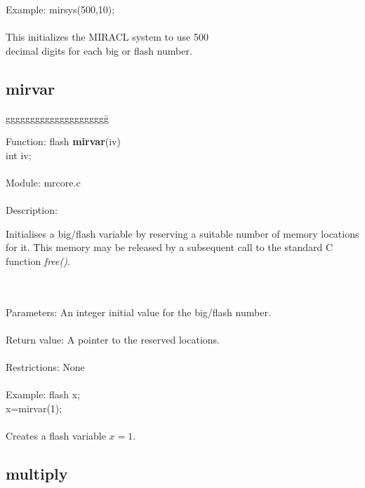 \begin{tabbing}
      Example:       \>mirsys(500,10); \\
      \ \\
                     \>This initializes the MIRACL system to use 500  \\
                     \>decimal digits for each big or flash number. \\

\end{tabbing}

\subsection{mirvar}

\begin{tabbing}
ggggggggggggggggggggg\= \kill

      Function:      \>flash {\bf mirvar}(iv) \\
                     \>int iv; \\
      \ \\
      Module:        \>mrcore.c \\
      \ \\
      Description:   \>
                     \parbox [t]{3 in}
                     {Initialises a big/flash variable by reserving a
                     suitable number of memory locations for it. This memory
                     may be released by a subsequent call to the standard C
                     function {\em free()}.} \\
      \ \\
      Parameters:    \>An integer initial value for the big/flash number. \\
      \ \\
      Return value:  \>A pointer to the reserved locations. \\
      \ \\
      Restrictions:  \>None \\
      \ \\
      Example:       \>flash x; \\
                     \>x=mirvar(1); \\
      \ \\
                     \>Creates a flash variable $x=1$. \\

\end{tabbing}

\subsection{multiply}

